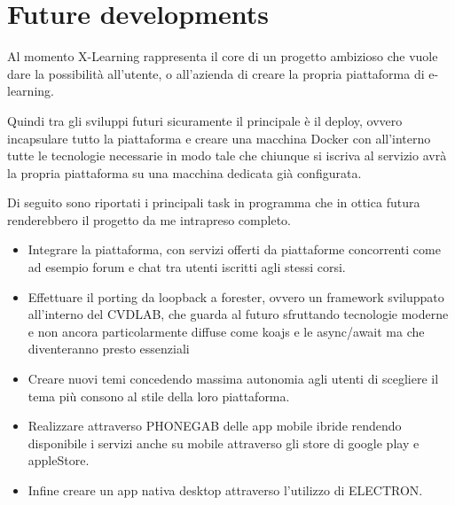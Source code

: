 \section{Future developments}
\label{sec:future_developments}
 
Al momento X-Learning rappresenta il core di un progetto ambizioso che vuole dare la possibilità all'utente, o all'azienda di creare la propria piattaforma di e-learning.

Quindi tra gli sviluppi futuri sicuramente il principale è il deploy, ovvero incapsulare tutto la piattaforma e creare una macchina Docker con all'interno tutte le tecnologie necessarie in modo tale che chiunque si iscriva al servizio avrà la propria piattaforma su una macchina dedicata già configurata.

Di seguito sono riportati i principali task in programma che in ottica futura renderebbero il progetto da me intrapreso completo.

\begin{itemize}
  \item Integrare la piattaforma, con servizi offerti da piattaforme concorrenti come ad esempio forum e chat tra utenti iscritti agli stessi corsi.

  \item Effettuare il porting da loopback a forester, ovvero un framework sviluppato all'interno del CVDLAB, che guarda al futuro sfruttando tecnologie moderne e non ancora particolarmente diffuse come koajs e le async/await ma che diventeranno presto essenziali 

  \item Creare nuovi temi concedendo massima autonomia agli utenti di scegliere il tema più consono al stile della loro piattaforma.

  \item Realizzare attraverso PHONEGAB delle app mobile ibride rendendo disponibile i servizi anche su mobile attraverso gli store di google play e appleStore.

  \item Infine creare un app nativa desktop attraverso l'utilizzo di ELECTRON.

\end{itemize}